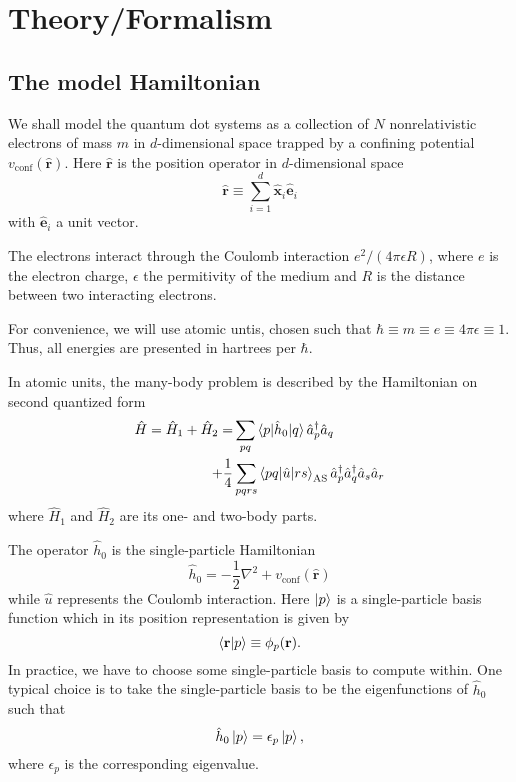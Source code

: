 \documentclass[aip,jcp,reprint,floatfix]{revtex4-1}
\begin{document}
\section{Theory/Formalism}
\subsection{The model Hamiltonian}
We shall model the quantum dot systems as a collection of $N$
nonrelativistic electrons of mass $m$ in $d$-dimensional space trapped
by a confining potential $v_{\text{conf}}(\mathbf{\hat{r}})$. Here
$\hat{\mathbf{r}}$ is the position operator in $d$-dimensional space
\begin{equation}
 \hat{\mathbf{r}} \equiv \sum_{i=1}^d \hat{\mathbf{x}}_i \hat{\mathbf{e}}_i
\end{equation}
with $\hat{\mathbf{e}}_i$ a unit vector.

The electrons interact through the Coulomb interaction $e^2/(4\pi
\epsilon R)$, where $e$ is the electron charge, $\epsilon$ the
permitivity of the medium and $R$ is the distance between two
interacting electrons.

For convenience, we will use atomic untis, chosen such that $\hbar
\equiv m \equiv e \equiv 4\pi \epsilon \equiv 1$. Thus, all energies
are presented in hartrees per $\hbar$.

In atomic units, the many-body problem is described by the Hamiltonian
on second quantized form
\begin{align}
 \hat{H} = \hat{H}_1 + \hat{H}_2 = &\sum_{pq} \braket{p|\hat{h}_0|q}\hat{a}_p^\dagger\hat{a}_q \nonumber \\
 + \frac{1}{4}&\sum_{pqrs}\braket{pq|\hat{u}|rs}_{\text{AS}}\hat{a}_p^\dagger\hat{a}_q^\dagger\hat{a}_s\hat{a}_r \label{FieldFreeHamiltonian}
\end{align}
where $\hat{H}_1$ and $\hat{H}_2$ are its one- and two-body parts. 

The operator $\hat{h}_0$ is the single-particle Hamiltonian
\begin{equation}
 \hat{h}_0 = -\frac{1}{2}\nabla^2 + v_{\text{conf}}(\mathbf{\hat{r}})
\end{equation}
while $\hat{u}$ represents the Coulomb interaction. Here $\ket{p}$ is
a single-particle basis function which in its position representation
is given by
\begin{equation}
 \braket{\mathbf{r}|p} \equiv \phi_p(\mathbf{r}).
\end{equation}
In practice, we have to choose some single-particle basis to compute
within. One typical choice is to take the single-particle basis to be
the eigenfunctions of $\hat{h}_0$ such that
\begin{equation}
 \hat{h}_0 \ket{p} = \epsilon_p \ket{p},
\end{equation}
where $\epsilon_p$ is the corresponding eigenvalue.
\end{document}
